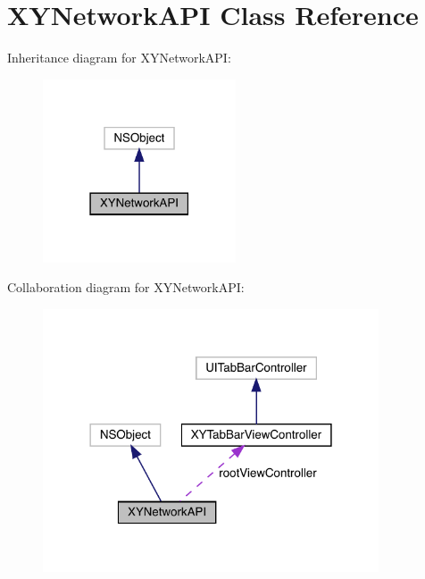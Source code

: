 \hypertarget{interface_x_y_network_a_p_i}{}\section{X\+Y\+Network\+A\+PI Class Reference}
\label{interface_x_y_network_a_p_i}


Inheritance diagram for X\+Y\+Network\+A\+PI\+:\nopagebreak
\begin{figure}[H]
\begin{center}
\leavevmode
\includegraphics[width=162pt]{interface_x_y_network_a_p_i__inherit__graph}
\end{center}
\end{figure}


Collaboration diagram for X\+Y\+Network\+A\+PI\+:\nopagebreak
\begin{figure}[H]
\begin{center}
\leavevmode
\includegraphics[width=282pt]{interface_x_y_network_a_p_i__coll__graph}
\end{center}
\end{figure}
